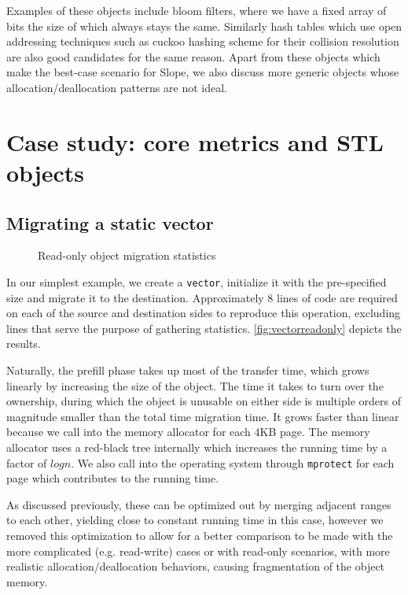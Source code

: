 Examples of these objects include bloom filters, where we have a fixed
array of bits the size of which always stays the same.
Similarly hash tables which use open addressing techniques such as cuckoo
hashing scheme for their collision resolution are also good candidates for the
same reason.
Apart from these objects which make the best-case scenario for Slope, we also
discuss more generic objects whose allocation/deallocation patterns are not
ideal.

\section{Case study: core metrics and STL objects}
\subsection{Migrating a static vector}

\begin{figure}[tp]
    \begin{center}
        
    \end{center}
    \caption{Read-only object migration statistics}
    \label{fig:vectorreadonly}
\end{figure}

In our simplest example, we create a \texttt{vector}, initialize it with the
pre-specified size and migrate it to the destination. Approximately $8$ lines
of code are required on each of the source and destination sides to reproduce
this operation, excluding lines that serve the purpose of gathering statistics.
\autoref{fig:vectorreadonly} depicts the results.

Naturally, the prefill phase takes up most of the transfer time, which grows
linearly by increasing the size of the object. The time it takes to turn over
the ownership, during which the object is unusable on either side is multiple
orders of magnitude smaller than the total time migration time.
It grows faster than linear because we call into the memory allocator
for each 4KB page. The memory allocator uses a red-black tree internally which
increases the running time by a factor of $log n$. We also call into the
operating system through \texttt{mprotect} for each page which contributes
to the running time.

As discussed previously, these can be optimized out by
merging adjacent ranges to each other, yielding close to constant running time
in this case, however we removed this optimization to allow for a better
comparison to be made with the more complicated (e.g. read-write) cases or
with read-only scenarios,
with more realistic allocation/deallocation behaviors, causing fragmentation
of the object memory.

